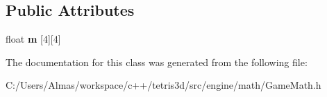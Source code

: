 \subsection*{Public Attributes}
\begin{DoxyCompactItemize}
\item 
\hypertarget{class_matrix4f_ad00c7a6c956f4ce9499a2c68914066cb}{float {\bfseries m} \mbox{[}4\mbox{]}\mbox{[}4\mbox{]}}\label{class_matrix4f_ad00c7a6c956f4ce9499a2c68914066cb}

\end{DoxyCompactItemize}


The documentation for this class was generated from the following file\-:\begin{DoxyCompactItemize}
\item 
C\-:/\-Users/\-Almas/workspace/c++/tetris3d/src/engine/math/Game\-Math.\-h\end{DoxyCompactItemize}
